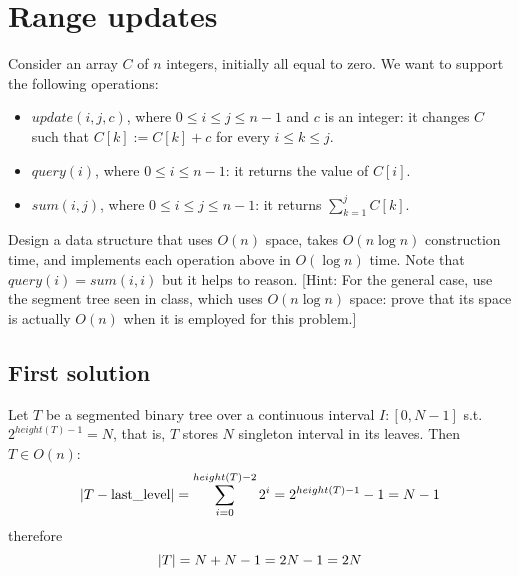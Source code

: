 \section{Range updates}

Consider an array $C$ of $n$ integers, initially all equal to zero. We want to support the following operations:
\begin{itemize}
  \item $update(i, j, c)$, where $0 \leq i \leq j \leq n - 1$ and $c$ is an integer: it changes $C$ such that $C[k] := C[k] + c$ for every $i \leq k \leq j$.
  \item $query(i)$, where $0 \leq i \leq n - 1$: it returns the value of $C[i]$.
  \item $sum(i,j)$, where $0 \leq i \leq j \leq n - 1$: it returns $\sum_{k = 1}^j C[k]$.
\end{itemize}

Design a data structure that uses $O(n)$ space, takes $O(n \log n)$ construction time, and implements each operation above in $O(\log n)$ time. Note that $query(i) = sum(i, i)$ but it helps to reason. [Hint: For the general case, use the segment tree seen in class, which uses $O(n \log n)$ space: prove that its space is actually $O(n)$ when it is employed for this problem.]

\subsection{First solution}

Let $T$ be a segmented binary tree over a continuous interval $I: [0, N -1]$ s.t. $2^{height(T) - 1} = N$, that is, $T$ stores $N$ singleton interval in its leaves.
Then $T \in O(n)$:
\begin{equation*}
\lvert T - \text{last\_level}\rvert = \sum_{i=0}^{height(T) - 2}2^i = 2^{height(T) - 1} - 1 = N - 1
\end{equation*}
therefore
\begin{equation*}
\lvert T\rvert = N + N - 1 = 2N - 1 = 2N
\end{equation*}


